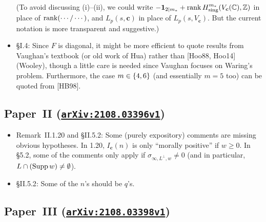 \documentclass[12pt]{article}
\begin{document}
\begin{itemize}
    (To avoid discussing (i)--(ii),
    we could write $-\bm{1}_{2\mid m_\ast} + \operatorname{rank} H^{m_\ast}_\textnormal{sing}(V_{\bm{c}}(\mathbb{C}),\mathbb{Z})$ in place of $\operatorname{rank}(\cdots/\cdots)$,
    and $L_p(s,\bm{c})$ in place of $L_p(s,V_{\bm{c}})$.
    But the current notation is more transparent and suggestive.)
    
    \item \S{I.4}:
    Since $F$ is diagonal, it might be more efficient to quote results from Vaughan's textbook (or old work of Hua) rather than [Hoo88, Hoo14] (Wooley),
    though a little care is needed since Vaughan focuses on Waring's problem.
    Furthermore, the case $m\in \{4,6\}$ (and essentially $m=5$ too) can be quoted from [HB98].
    
\end{itemize}

\subsection{Paper~II (\href{https://arxiv.org/abs/2108.03396v1}{\texttt{arXiv:2108.03396v1}})}

\begin{itemize}
    \item Remark~II.1.20 and \S{II.5.2}:
    Some (purely expository) comments are missing obvious hypotheses.
    In 1.20, $I_{\bm{c}}(n)$ is only ``morally positive'' if $w\geq 0$.
    In \S5.2, some of the comments only apply if $\sigma_{\infty,L^\perp,w}\neq 0$ (and in particular, $L\cap (\operatorname{Supp}{w})\neq \emptyset$).
    
    \item \S{II.5.2}:
    Some of the $n$'s should be $q$'s.
\end{itemize}

\subsection{Paper~III (\href{https://arxiv.org/abs/2108.03398v1}{\texttt{arXiv:2108.03398v1}})}
\end{document}
